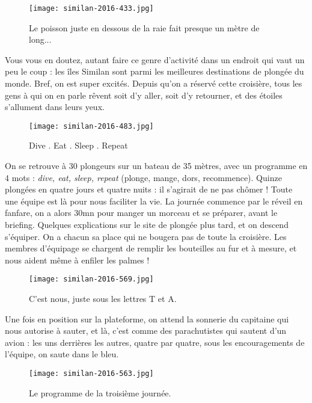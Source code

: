 \documentclass{book}
\begin{document}
\begin{figure}[h]
\centering
\texttt{[image: similan-2016-433.jpg]}
\caption*{Le poisson juste en dessous de la raie fait presque un mètre de long...}
\end{figure}

Vous vous en doutez, autant faire ce genre d'activité dans un endroit qui vaut un peu le coup : les îles Similan sont parmi les meilleures destinations de plongée du monde. Bref, on est super excités. Depuis qu'on a réservé cette croisière, tous les gens à qui on en parle rêvent soit d'y aller, soit d'y retourner, et des étoiles s'allument dans leurs yeux.


\begin{figure}[h]
\centering
\texttt{[image: similan-2016-483.jpg]}
\caption*{Dive . Eat . Sleep . Repeat}
\end{figure}

On se retrouve à 30 plongeurs sur un bateau de 35 mètres, avec un programme en 4 mots : \emph{dive, eat, sleep, repeat} (plonge, mange, dors, recommence). Quinze plongées en quatre jours et quatre nuits : il s'agirait de ne pas chômer ! Toute une équipe est là pour nous faciliter la vie. La journée commence par le réveil en fanfare, on a alors 30mn pour manger un morceau et se préparer, avant le briefing. Quelques explications sur le site de plongée plus tard, et on descend s'équiper. On a chacun sa place qui ne bougera pas de toute la croisière. Les membres d'équipage se chargent de remplir les bouteilles au fur et à mesure, et nous aident même à enfiler les palmes !


\begin{figure}[h]
\centering
\texttt{[image: similan-2016-569.jpg]}
\caption*{C'est nous, juste sous les lettres T et A.}
\end{figure}

Une fois en position sur la plateforme, on attend la sonnerie du capitaine qui nous autorise à sauter, et là, c'est comme des parachutistes qui sautent d'un avion : les uns derrières les autres, quatre par quatre, sous les encouragements de l'équipe, on saute dans le bleu.


\begin{figure}[h]
\centering
\texttt{[image: similan-2016-563.jpg]}
\caption*{Le programme de la troisième journée.}
\end{figure}
\end{document}

